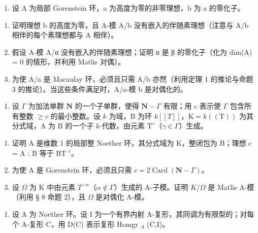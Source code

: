 \begin{enumerate}
\def\labelenumi{\arabic{enumi})}
\setcounter{enumi}{7}
\tightlist
\item
  设 A 为局部 Gorenstein 环，a 为高度为零的非零理想，b 为 a 的零化子。
\end{enumerate}

\begin{enumerate}
\def\labelenumi{\alph{enumi})}
\item
  证明理想 b 的高度为零，且 A-模 A/b 没有嵌入的伴随素理想（注意与 A/b 相伴的每个素理想都与 A 相伴）。
\item
  假设 A-模 A/α 没有嵌入的伴随素理想；证明 α 是 β 的零化子（化为 dim(A) = 0 的情形，并利用 Matlis 对偶）。
\item
  为使 A/a 是 Macaulay 环，必须且只需 A/b 亦然（利用定理 1 的推论与命题 3 的推论）。当这些条件满足时，A/a-模 b 是对偶化的。
\end{enumerate}

\begin{enumerate}
\def\labelenumi{\arabic{enumi})}
\setcounter{enumi}{8}
\tightlist
\item
  设 \(\Gamma\) 为加法单群 \(\mathbf{N}\) 的一个子单群，使得 \(\mathbf{N} - \Gamma\) 有限；用 \(c\) 表示使 \(\Gamma\) 包含所有整数 \(\geqslant c\) 的最小整数。设 \(k\) 为域，B 为环 \(k[[T]]\)，\(\mathrm{K} = k((\mathrm{T}))\) 为其分式域，A 为 B 的一个子 \(k\)-代数，由元素 \(\mathrm{T}^{\gamma}\)（\(\gamma \in \Gamma\)）生成。
\end{enumerate}

\begin{enumerate}
\def\labelenumi{\alph{enumi})}
\item
  证明 A 是维数 1 的局部整 Noether 环，其分式域为 K，整闭包为 B；理想 c = A : B 等于 BT \(^{c}\)。
\item
  为使 A 是 Gorenstein 环，必须且只需 \(c = 2\operatorname{Card}(\mathbf{N} - \Gamma)\)。
\item
  设 \(\Omega\) 为 K 中由元素 \(T^{-\alpha}\)（\(\alpha \notin \Gamma\)）生成的 A-子模。证明 \(K/\Omega\) 是 Matlis A-模（利用 § 8 命题 2），且 \(\Omega\) 是对偶化 A-模。
\end{enumerate}

\begin{enumerate}
\def\labelenumi{\arabic{enumi})}
\setcounter{enumi}{9}
\tightlist
\item
  设 A 为 Noether 环。设 I 为一个有界内射 A-复形，其同调为有限型的；对每个 A-复形 C，用 D(C) 表示复形 Homgr \(_{A}\) (C,I)。
\end{enumerate}

